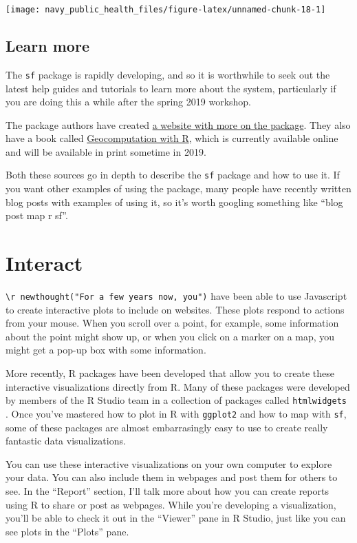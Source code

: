 \documentclass[]{tufte-book}
\begin{document}
\texttt{[image: navy\_public\_health\_files/figure-latex/unnamed-chunk-18-1]}

\hypertarget{learn-more-1}{%
\section{Learn more}\label{learn-more-1}}

The \texttt{sf} package is rapidly developing, and so it is worthwhile to seek out the latest
help guides and tutorials to learn more about the system, particularly if you are doing
this a while after the spring 2019 workshop.

The package authors have created
\href{https://cran.r-project.org/web/packages/sf/vignettes/sf1.html}{a website with more on the package}.
They also have a book called \href{https://geocompr.robinlovelace.net/}{Geocomputation with R}, which
is currently available online and will be available in print sometime in 2019.

Both these sources go in depth to describe the \texttt{sf} package and how to use it. If you want
other examples of using the package, many people have recently written blog posts with examples
of using it, so it's worth googling something like ``blog post map r sf''.

\hypertarget{interact}{%
\chapter{Interact}\label{interact}}

\texttt{\textbackslash{}r\ newthought("For\ a\ few\ years\ now,\ you")} have been able to use Javascript to create
interactive plots to include on
websites. These plots respond to actions from your mouse. When you scroll over a point,
for example, some information about the point might show up, or when you click on a marker
on a map, you might get a pop-up box with some information.

More recently, R packages have been developed that allow you to create these interactive
visualizations directly from R. Many of these packages were developed by members of the
R Studio team in a collection of packages called \texttt{htmlwidgets} \citep{R-htmlwidgets}. Once you've
mastered how to plot in R with \texttt{ggplot2} and how to map with \texttt{sf}, some of these packages
are almost embarrasingly easy to use to create really fantastic data visualizations.

You can use these interactive visualizations on your own computer to explore your
data. You can also include them in webpages and post them for others to see. In the
``Report'' section, I'll talk more about how you can create reports using R to share or post as
webpages. While you're developing a visualization, you'll be able to check it out in
the ``Viewer'' pane in R Studio, just like you can see plots in the ``Plots'' pane.
\end{document}
